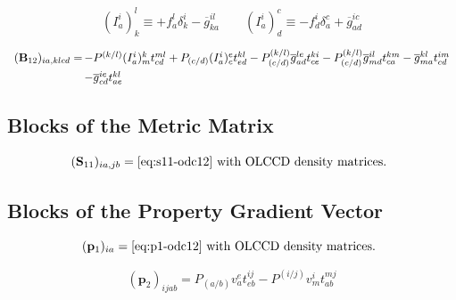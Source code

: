 \begin{subappendices}
\begin{equation}
    (I_a^i)_k^l
    \equiv
    +
    f_a^l
    \delta_k^i
    -
    \overline{g}_{ka}^{il}
    \qquad
    (I_a^i)_d^c
    \equiv
    -
    f_d^i
    \delta_a^c
    +
    \overline{g}_{ad}^{ic}
\end{equation}

\begin{equation}
    \begin{array}{r@{\,}l}
        (\mathbf{B}_{12})_{ia,klcd}
        =
        &
        -
        P^{(k/l)}
        (I_a^i)_m^k
        t_{cd}^{ml}
        +
        P_{(c/d)}
        (I_a^i)_c^e
        t_{ed}^{kl}
        -
        P_{(c/d)}^{(k/l)}
        \overline{g}_{ad}^{le}
        t_{ce}^{ki}
        -
        P_{(c/d)}^{(k/l)}
        \overline{g}_{md}^{il}
        t_{ca}^{km}
        -
        \overline{g}_{ma}^{kl}
        t_{cd}^{im}
        \\[5pt]
        &
        -
        \overline{g}_{cd}^{ie}
        t_{ae}^{kl}
    \end{array}
\end{equation}

\subsection{Blocks of the Metric Matrix}

\begin{equation}
    (\mathbf{S}_{11})_{ia,jb}
    =
    \text{%
        \Cref{eq:s11-odc12} with OLCCD density matrices.
    }
\end{equation}

\subsection{Blocks of the Property Gradient Vector}

\begin{equation}
    (\mathbf{p}_1)_{ia}
    =
    \text{%
        \Cref{eq:p1-odc12} with OLCCD density matrices.
    }
\end{equation}

\begin{equation}
    (\mathbf{p}_2)_{ijab}
    =
    P_{(a/b)}
    v_a^e
    t_{eb}^{ij}
    -
    P^{(i/j)}
    v_m^i
    t_{ab}^{mj}
\end{equation}

\end{subappendices}
